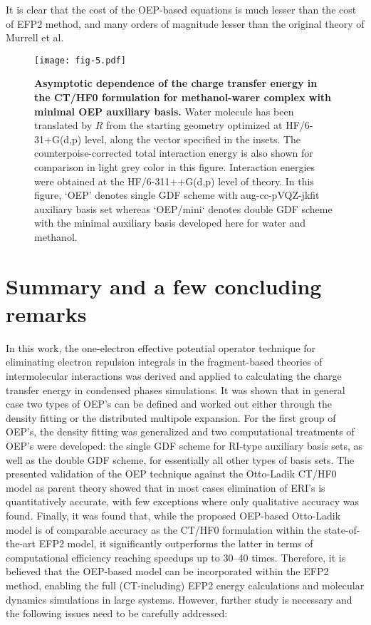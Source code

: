 %
It is clear that the cost of the OEP\hyp{}based equations is much lesser than the cost of EFP2 method,
and many orders of magnitude lesser than the original theory of Murrell et al.
%
\begin{figure}[h]
\texttt{[image: fig-5.pdf]}
\caption{\label{f:fig-5} {\bf Asymptotic dependence of the charge transfer energy
in the CT/HF0 formulation for methanol-warer complex with minimal OEP auxiliary basis.} 
Water molecule has been translated by $R$ from the starting geometry
optimized at HF/6-31+G(d,p) level,
along the vector specified in the insets.
The counterpoise\hyp{}corrected total interaction energy
is also shown for comparison in light grey color in this figure.
Interaction energies were obtained at the HF/6-311++G(d,p) level of theory.
In this figure, `OEP' denotes single GDF scheme with aug-cc-pVQZ-jkfit auxiliary basis set
whereas `OEP/mini` denotes double GDF scheme with the minimal auxiliary basis
developed here for water and methanol.
} 
\end{figure}
%



\section{\label{s:6.conclusions}Summary and a few concluding remarks}

In this work, the one\hyp{}electron effective potential operator technique
for eliminating electron repulsion integrals in the fragment\hyp{}based
theories of intermolecular interactions
was derived and applied to calculating the charge transfer energy
in condensed phases simulations. It was shown that in general case two types of OEP's
can be defined and worked out either through the density fitting or the distributed
multipole expansion. For the first group of OEP's, the density fitting was generalized
and two computational treatments of OEP's were developed: the single GDF scheme
for RI\hyp{}type auxiliary basis sets, as well as the double GDF scheme, for
essentially all other types of basis sets. The presented validation of the OEP technique
against the Otto\hyp{}Ladik CT/HF0 model as parent theory showed that in most cases
elimination of ERI's is quantitatively accurate, with few exceptions
where only qualitative accuracy was found. 
Finally, it was found that, while the proposed OEP\hyp{}based Otto\hyp{}Ladik
model is of comparable accuracy as the CT/HF0 formulation within the
state\hyp{}of\hyp{}the\hyp{}art EFP2 model, it significantly outperforms the latter
in terms of computational efficiency reaching speedups up to 30--40 times.
Therefore, it is believed that the OEP\hyp{}based
model can be incorporated within the EFP2 method, enabling
the full (CT\hyp{}including) EFP2 energy calculations and 
molecular dynamics simulations in large systems. However, further 
study is necessary and the following issues need to be carefully addressed:

